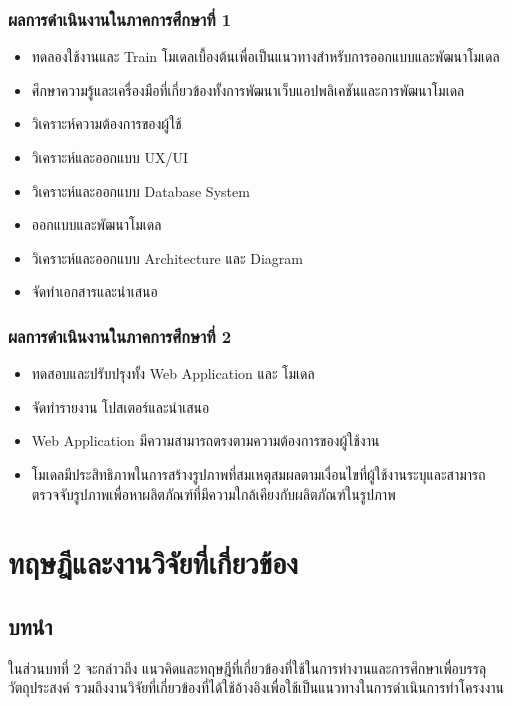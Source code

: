 \documentclass[12pt,oneside,openright,a4paper]{cpe-thai-project}
\begin{document}
\subsection{ผลการดำเนินงานในภาคการศึกษาที่ 1}

\begin{itemize}
\item ทดลองใช้งานและ Train โมเดลเบื้องต้นเพื่อเป็นแนวทางสำหรับการออกแบบและพัฒนาโมเดล
\item ศึกษาความรู้และเครื่องมือที่เกี่ยวข้องทั้งการพัฒนาเว็บแอปพลิเคชันและการพัฒนาโมเดล
\item วิเคราะห์ความต้องการของผู้ใช้
\item วิเคราะห์และออกแบบ UX/UI
\item วิเคราะห์และออกแบบ Database System
\item ออกแบบและพัฒนาโมเดล
\item วิเคราะห์และออกแบบ Architecture และ Diagram
\item จัดทำเอกสารและนำเสนอ
\end{itemize}

\subsection{ผลการดำเนินงานในภาคการศึกษาที่ 2}

\begin{itemize}
\item ทดสอบและปรับปรุงทั้ง Web Application และ โมเดล
\item จัดทำรายงาน โปสเตอร์และนำเสนอ
\item Web Application มีความสามารถตรงตามความต้องการของผู้ใช้งาน
\item โมเดลมีประสิทธิภาพในการสร้างรูปภาพที่สมเหตุสมผลตามเงื่อนไขที่ผู้ใช้งานระบุและสามารถตรวจจับรูปภาพเพื่อหาผลิตภัณฑ์ที่มีความใกล้เคียงกับผลิตภัณฑ์ในรูปภาพ
\end{itemize}

\chapter{ทฤษฎีและงานวิจัยที่เกี่ยวข้อง}

\section{บทนำ}
\hspace {18pt} ในส่วนบทที่ 2 จะกล่าวถึง แนวคิดและทฤษฎีที่เกี่ยวข้องที่ใช้ในการทำงานและการศึกษาเพื่อบรรลุวัตถุประสงค์ รวมถึงงานวิจัยที่เกี่ยวข้องที่ได้ใช้อ้างอิงเพื่อใช้เป็นแนวทางในการดำเนินการทำโครงงาน
\end{document}
